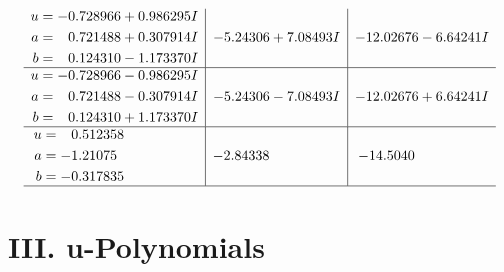 \documentclass[1p]{elsarticle_modified}
\theoremstyle{definition}
\begin{document}
$$\begin{array}{c|c|c}
\begin{aligned}
u &= -0.728966 + 0.986295 I \\
a &= \phantom{-}0.721488 + 0.307914 I \\
b &= \phantom{-}0.124310 - 1.173370 I\end{aligned}
 & -5.24306 + 7.08493 I & -12.02676 - 6.64241 I \\ \hline\begin{aligned}
u &= -0.728966 - 0.986295 I \\
a &= \phantom{-}0.721488 - 0.307914 I \\
b &= \phantom{-}0.124310 + 1.173370 I\end{aligned}
 & -5.24306 - 7.08493 I & -12.02676 + 6.64241 I \\ \hline\begin{aligned}
u &= \phantom{-}0.512358\phantom{ +0.000000I} \\
a &= -1.21075\phantom{ +0.000000I} \\
b &= -0.317835\phantom{ +0.000000I}\end{aligned}
 & -2.84338\phantom{ +0.000000I} & -14.5040\phantom{ +0.000000I}\\
 \hline 
 \end{array}$$\newpage
\newpage\renewcommand{\arraystretch}{1}
\centering \section*{ III. u-Polynomials}
\end{document}
